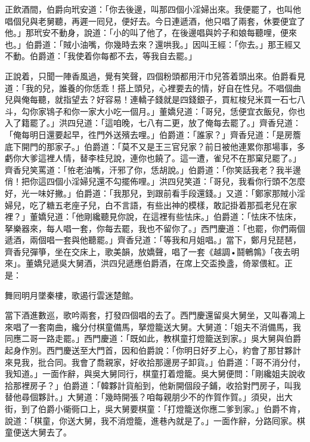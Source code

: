 正飲酒間，伯爵向玳安道：「你去後邊，叫那四個小淫婦出來。我便罷了，也叫他唱個兒與老舅聽，再遲一囘兒，便好去。今日連遞酒，他只唱了兩套，休要便宜了他。」那玳安不動身，說道：「小的叫了他了，在後邊唱與妗子和娘每聽哩，便來也。」伯爵道：「賊小油嘴，你幾時去來？還哄我。」因叫王經：「你去。」那王經又不動。伯爵道：「我使着你每都不去，等我自去罷。」

正說着，只聞一陣香風過，覺有笑聲，四個粉頭都用汗巾兒答着頭出來。伯爵看見道：「我的兒，誰養的你恁乖！搭上頭兒，心裡要去的情，好自在性兒。不唱個曲兒與俺每聽，就指望去？好容易！連轎子錢就是四錢銀子，買紅梭兒米買一石七八斗，勾你家鴇子和你一家大小吃一個月。」董嬌兒道：「哥兒，恁便宜衣飯兒，你也入了籍罷了。」洪四兒道：「這咱晚，七八有二更，放了俺每去罷了。」齊香兒道：「俺每明日還要起早，徃門外送殯去哩。」伯爵道：「誰家？」齊香兒道：「是房簷底下開門的那家子。」伯爵道：「莫不又是王三官兒家？前日被他連累你那場事，多虧你大爹這裡人情，替李桂兒說，連你也饒了。這一遭，雀兒不在那窠兒罷了。」{}齊香兒笑罵道：「恠老油嘴，汗邪了你，恁胡說。」伯爵道：「你笑話我老？我半邊俏！把你這四個小淫婦兒還不勾擺佈哩。」洪四兒笑道：「哥兒，我看你行頭不怎麼好，光一味好撇。」伯爵道：「我那兒，到跟前看手段還錢。」又道：「鄭家那賊小淫婦兒，吃了糖五老座子兒，白不言語，有些出神的模樣，敢記掛着那孤老兒在家裡？」董嬌兒道：「他剛纔聽見你說，在這裡有些怯床。」伯爵道：「怯床不怯床，拏樂器來，每人唱一套，你每去罷，我也不留你了。」西門慶道：「也罷，你們兩個遞酒，兩個唱一套與他聽罷。」齊香兒道：「等我和月姐唱。」當下，鄭月兒琵琶，齊香兒彈箏，坐在交床上，歌美韻，放嬌聲，唱了一套《越調•鬪鵪鶉》「夜去明來」。董嬌兒遞吳大舅酒，洪四兒遞應伯爵酒，在席上交盃換盞，倚翠偎紅。正是：

\begin{myquote} 
舞囘明月墜秦樓，歌遏行雲迷楚館。
\end{myquote} 

當下酒進數巡，歌吟兩套，打發四個唱的去了。西門慶還留吳大舅坐，又叫春鴻上來唱了一套南曲，纔分付棋童備馬，拏燈籠送大舅。大舅道：「姐夫不消備馬，我同應二哥一路走罷。」西門慶道：「既如此，教棋童打燈籠送到家。」吳大舅與伯爵起身作別。西門慶送至大門首，因和伯爵說：「你明日好歹上心，約會了那甘夥計來見我，批合同。我會了喬親家，好收拾那邊房子卸貨。」伯爵道：「哥不消分付，我知道。」一面作辭，與吳大舅同行，棋童打着燈籠。吳大舅便問：「剛纔姐夫說收拾那裡房子？」伯爵道：「韓夥計貨船到，他新開個段子鋪，收拾對門房子，叫我替他尋個夥計。」大舅道：「幾時開張？咱每親朋少不的作賀作賀。」{}須臾，出大街，到了伯爵小衚衕口上，吳大舅要棋童：「打燈籠送你應二爹到家。」伯爵不肯，說道：「棋童，你送大舅，我不消燈籠，進巷內就是了。」一面作辭，分路囘家。棋童便送大舅去了。

